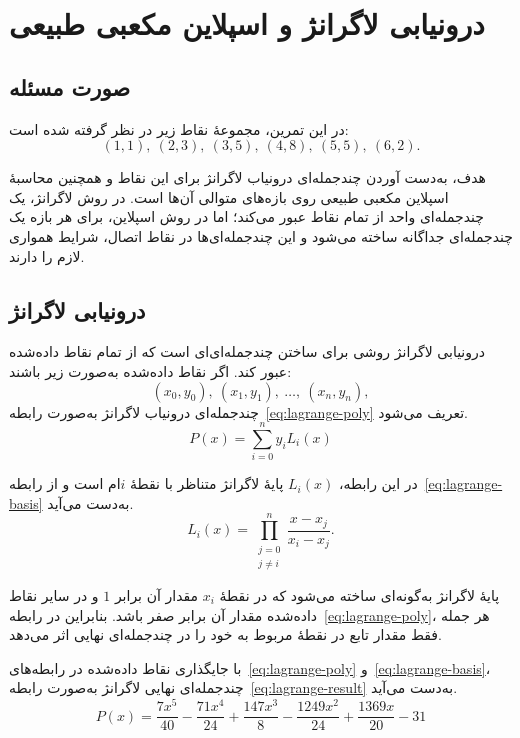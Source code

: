 \documentclass[12pt]{article}
\begin{document}
	
	\section{درونیابی لاگرانژ و اسپلاین مکعبی طبیعی}
	
	\subsection{صورت مسئله}
	
	در این تمرین، مجموعهٔ نقاط زیر در نظر گرفته شده است:
	\[
	(1,1),\ (2,3),\ (3,5),\ (4,8),\ (5,5),\ (6,2).
	\]
	
	هدف، به‌دست آوردن چندجمله‌ای درونیاب لاگرانژ برای این نقاط و همچنین محاسبهٔ اسپلاین مکعبی طبیعی روی بازه‌های متوالی آن‌ها است. در روش لاگرانژ، یک چندجمله‌ای واحد از تمام نقاط عبور می‌کند؛ اما در روش اسپلاین، برای هر بازه یک چندجمله‌ای جداگانه ساخته می‌شود و این چندجمله‌ای‌ها در نقاط اتصال، شرایط همواری لازم را دارند.
	
	\subsection{درونیابی لاگرانژ}
	
	درونیابی لاگرانژ روشی برای ساختن چندجمله‌ای‌ای است که از تمام نقاط داده‌شده عبور کند. اگر نقاط داده‌شده به‌صورت زیر باشند:
	\[
	(x_0,y_0),\ (x_1,y_1),\ \ldots,\ (x_n,y_n),
	\]
	چندجمله‌ای درونیاب لاگرانژ به‌صورت رابطه~\eqref{eq:lagrange-poly} تعریف می‌شود.
	\begin{equation}
		P(x)=\sum_{i=0}^{n} y_i L_i(x)
		\label{eq:lagrange-poly}
	\end{equation}
	
	در این رابطه، $L_i(x)$ پایهٔ لاگرانژ متناظر با نقطهٔ $i$ام است و از رابطه~\eqref{eq:lagrange-basis} به‌دست می‌آید.
	\begin{equation}
		L_i(x)=
		\prod_{\substack{j=0 \\ j\neq i}}^{n}
		\frac{x-x_j}{x_i-x_j}.
		\label{eq:lagrange-basis}
	\end{equation}
	
	پایهٔ لاگرانژ به‌گونه‌ای ساخته می‌شود که در نقطهٔ $x_i$ مقدار آن برابر $1$ و در سایر نقاط داده‌شده مقدار آن برابر صفر باشد. بنابراین در رابطه~\eqref{eq:lagrange-poly}، هر جمله فقط مقدار تابع در نقطهٔ مربوط به خود را در چندجمله‌ای نهایی اثر می‌دهد.
	
	با جایگذاری نقاط داده‌شده در رابطه‌های~\eqref{eq:lagrange-poly} و~\eqref{eq:lagrange-basis}، چندجمله‌ای نهایی لاگرانژ به‌صورت رابطه~\eqref{eq:lagrange-result} به‌دست می‌آید.
	\begin{equation}
		P(x)=
		\frac{7x^5}{40}
		-\frac{71x^4}{24}
		+\frac{147x^3}{8}
		-\frac{1249x^2}{24}
		+\frac{1369x}{20}
		-31
		\label{eq:lagrange-result}
	\end{equation}
	
\end{document}
